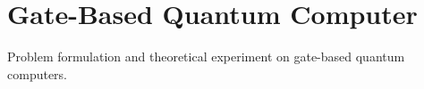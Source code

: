 \section{Gate-Based Quantum Computer}

Problem formulation and theoretical experiment on gate-based quantum computers.
